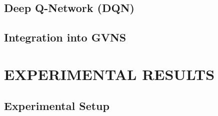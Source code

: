 \documentclass[final,11pt,times]{elsarticle}
\begin{document}

\subsection{Deep Q-Network (DQN)}



\subsection{Integration into GVNS}



\section{EXPERIMENTAL RESULTS}
\label{sec:results}

\subsection{Experimental Setup}
\end{document}
